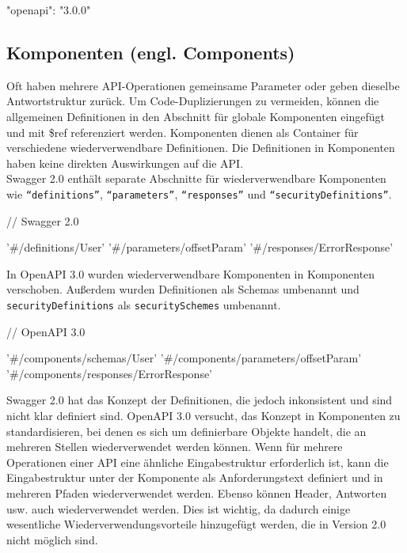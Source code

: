 \begin{LaTeXCode}[caption={Version von Open API},captionpos=b, label=LaTeXCode:openapi3.0-1][numbers=none]
"openapi": "3.0.0"\\
\end{LaTeXCode}

\subsection{Komponenten (engl. Components)}

Oft haben mehrere API-Operationen gemeinsame Parameter oder geben dieselbe Antwortstruktur zurück. Um Code-Duplizierungen zu vermeiden, können die allgemeinen Definitionen in den Abschnitt für globale Komponenten eingefügt und mit \$ref referenziert werden. Komponenten dienen als Container für verschiedene wiederverwendbare Definitionen. Die Definitionen in Komponenten haben keine direkten Auswirkungen auf die API\cite{openapicomponents17}.\\

Swagger 2.0 enthält separate Abschnitte für wiederverwendbare Komponenten wie \texttt{"`definitions"'}, \texttt{"`parameters"'}, \texttt{"`responses"'} und \texttt{"`securityDefinitions"'}.\\

\begin{LaTeXCode}[caption={Open API 2.0 - Komponenten\cite{openapicomponents17}},captionpos=b, label=LaTeXCode:openapi3.0-2][numbers=none]
// Swagger 2.0    

'#/definitions/User'
'#/parameters/offsetParam'
'#/responses/ErrorResponse'
\end{LaTeXCode}

In OpenAPI 3.0 wurden wiederverwendbare Komponenten in Komponenten verschoben. Außerdem wurden Definitionen als Schemas umbenannt und \texttt{securityDefinitions} als \texttt{securitySchemes} umbenannt.\\

\begin{LaTeXCode}[caption={Open API 3.0 - Komponenten\cite{openapicomponents17}},captionpos=b, label=LaTeXCode:openapi3.0-3][numbers=none]
// OpenAPI 3.0

'#/components/schemas/User'
'#/components/parameters/offsetParam'
'#/components/responses/ErrorResponse'
\end{LaTeXCode}

Swagger 2.0 hat das Konzept der Definitionen, die jedoch inkonsistent und sind nicht klar definiert sind. OpenAPI 3.0 versucht, das Konzept in Komponenten zu standardisieren, bei denen es sich um definierbare Objekte handelt, die an mehreren Stellen wiederverwendet werden können. Wenn für mehrere Operationen einer API eine ähnliche Eingabestruktur erforderlich ist, kann die Eingabestruktur unter der Komponente als Anforderungstext definiert und in mehreren Pfaden wiederverwendet werden. Ebenso können Header, Antworten usw. auch wiederverwendet werden. Dies ist wichtig, da dadurch einige wesentliche Wiederverwendungsvorteile hinzugefügt werden, die in Version 2.0 nicht möglich sind.\\

